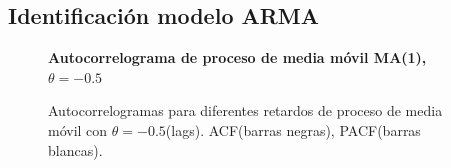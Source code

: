 \subsection{Identificaci\'on modelo ARMA}


\begin{figure}[h]
	\centering
	\textbf{Autocorrelograma de proceso de media móvil MA(1), $\theta=-0.5$ }\par\medskip
	\caption{Autocorrelogramas para diferentes retardos de proceso de media móvil con $\theta=-0.5$(lags). ACF(barras negras), PACF(barras blancas).}\label{fig13}
\end{figure}



